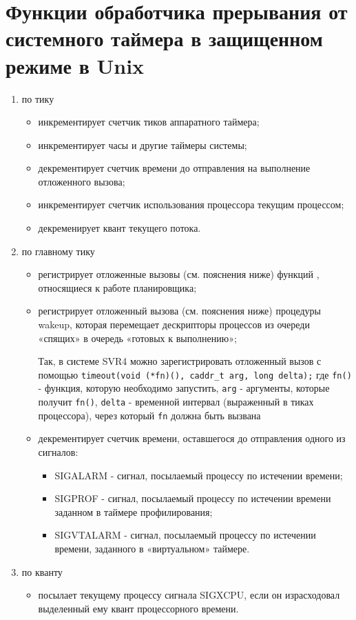 \section{Функции обработчика прерывания от системного таймера в защищенном режиме в Unix}

\begin{enumerate}
	\item по тику
	      \begin{itemize}
		      \item инкрементирует счетчик тиков аппаратного таймера;
		      \item инкрементирует часы и другие таймеры системы;
		      \item декрементирует счетчик времени до отправления на выполнение отложенного вызова;
		      \item инкрементирует счетчик использования процессора текущим процессом;
		      \item декременирует квант текущего потока.
	      \end{itemize}
	\item по главному тику
	      \begin{itemize}
		      \item регистрирует отложенные вызовы (см. пояснения ниже) функций , относящиеся к работе планировщика;
		      \item регистрирует отложенный вызова (см. пояснения ниже) процедуры wakeup, которая
		            перемещает дескрипторы процессов из очереди «спящих» в
					очередь «готовых к выполнению»;

Так, в системе SVR4 можно зарегистрировать отложенный вызов с помощью
\texttt{timeout(void (*fn)(), caddr\_t arg, long delta);} где \texttt{fn()} - функция, которую
необходимо запустить, \texttt{arg} - аргументы, которые получит \texttt{fn()}, \texttt{delta} - временной
интервал (выраженный в тиках процессора), через который \texttt{fn} должна быть вызвана 
		      \item декрементирует счетчик времени, оставшегося до отправления одного из
		            сигналов: 
		            \begin{itemize}
			            \item SIGALARM - сигнал, посылаемый процессу по истечении времени;
			            \item SIGPROF - сигнал, посылаемый процессу по истечении времени заданном в таймере профилирования;
			            \item SIGVTALARM - сигнал, посылаемый процессу по истечении времени, заданного в «виртуальном» таймере.
		            \end{itemize}
	      \end{itemize}
	\item по кванту
	      \begin{itemize}
		      \item посылает текущему процессу сигнала SIGXCPU, если он
		            израсходовал выделенный ему квант процессорного времени.
	      \end{itemize}
\end{enumerate}

